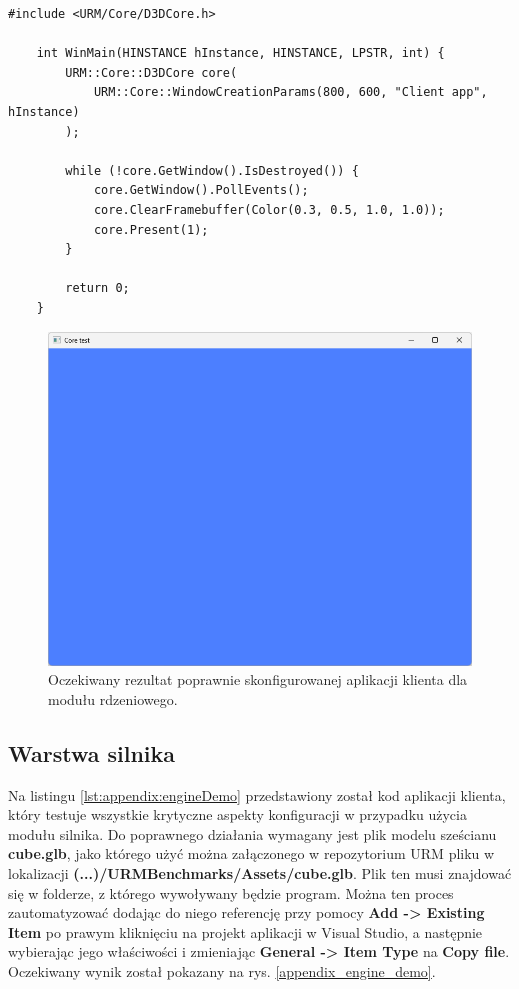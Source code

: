 \begin{lstlisting}[caption={Aplikacja przykładowa wykorzystująca interfejs modułu rdzeniowego}, label={lst:appendix:coreDemo}]
	#include <URM/Core/D3DCore.h>
	
	int WinMain(HINSTANCE hInstance, HINSTANCE, LPSTR, int) {
		URM::Core::D3DCore core(
			URM::Core::WindowCreationParams(800, 600, "Client app", hInstance)
		);
		
		while (!core.GetWindow().IsDestroyed()) {
			core.GetWindow().PollEvents();
			core.ClearFramebuffer(Color(0.3, 0.5, 1.0, 1.0));
			core.Present(1);
		}
		
		return 0;
	}
\end{lstlisting}

\begin{figure}[h!]
	\centering
	\includegraphics[width=\textwidth]{images/appendix_core_demo.png}
	\caption{Oczekiwany rezultat poprawnie skonfigurowanej aplikacji klienta dla modułu rdzeniowego.}
	\label{appendix_core_demo}
\end{figure}

\vfill
\clearpage

\subsection*{Warstwa silnika}
Na listingu \ref{lst:appendix:engineDemo} przedstawiony został kod aplikacji klienta, który testuje wszystkie krytyczne aspekty konfiguracji w przypadku użycia modułu silnika. Do poprawnego działania wymagany jest plik modelu sześcianu \textbf{cube.glb}, jako którego użyć można załączonego w repozytorium URM \cite{GitHub:Minik:MasterThesisUniversalRenderingModuleD3D11} pliku w lokalizacji \textbf{(...)/URMBenchmarks/Assets/cube.glb}. Plik ten musi znajdować się w folderze, z którego wywoływany będzie program. Można ten proces zautomatyzować dodając do niego referencję przy pomocy \textbf{Add -> Existing Item} po prawym kliknięciu na projekt aplikacji w Visual Studio, a następnie wybierając jego właściwości i zmieniając \textbf{General -> Item Type} na \textbf{Copy file}. Oczekiwany wynik został pokazany na rys. \ref{appendix_engine_demo}.

